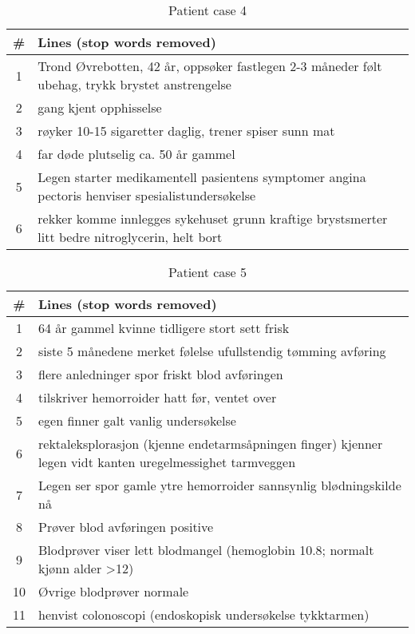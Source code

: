 \begin{table}[htbp] \footnotesize \center
\caption{Patient case 4\label{tab:pcase4}}
\begin{tabularx}{\textwidth}{c X}
    \toprule
    \# & Lines (stop words removed) \\
    \midrule
	1 & Trond Øvrebotten, 42 år, oppsøker fastlegen 2-3 måneder følt ubehag, trykk brystet anstrengelse \\
	2 & gang kjent opphisselse \\
	3 & røyker 10-15 sigaretter daglig, trener spiser sunn mat \\
	4 & far døde plutselig ca. 50 år gammel \\
	5 & Legen starter medikamentell pasientens symptomer angina pectoris henviser spesialistundersøkelse \\
	6 & rekker komme innlegges sykehuset grunn kraftige brystsmerter litt bedre nitroglycerin, helt bort \\
	\bottomrule
\end{tabularx}
\end{table}


\begin{table}[htbp] \footnotesize \center
\caption{Patient case 5\label{tab:pcase5}}
\begin{tabularx}{\textwidth}{c X}
    \toprule
    \# & Lines (stop words removed) \\
    \midrule
	1 & 64 år gammel kvinne tidligere stort sett frisk \\
	2 & siste 5 månedene merket følelse ufullstendig tømming avføring \\
	3 & flere anledninger spor friskt blod avføringen \\
	4 & tilskriver hemorroider hatt før, ventet over \\
	5 & egen finner galt vanlig undersøkelse \\
	6 & rektaleksplorasjon (kjenne endetarmsåpningen finger) kjenner legen vidt kanten uregelmessighet tarmveggen \\
	7 & Legen ser spor gamle ytre hemorroider sannsynlig blødningskilde nå \\
	8 & Prøver blod avføringen positive \\
	9 & Blodprøver viser lett blodmangel (hemoglobin 10.8; normalt kjønn alder >12) \\
	10 & Øvrige blodprøver normale \\
	11 & henvist colonoscopi (endoskopisk undersøkelse tykktarmen) \\
	\bottomrule
\end{tabularx}
\end{table}


